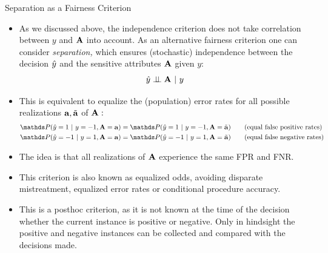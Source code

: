 \begin{vbframe}{Separation as a Fairness Criterion}
	\footnotesize{
		\begin{itemize}
			\item As we discussed above, the independence criterion does not take correlation between $y$ and $\mathbf{A}$ into account. As an alternative fairness criterion one can consider \emph{separation,} which ensures (stochastic) independence between the decision $\hat{y}$ and the sensitive attributes $\mathbf{A}$ given $y:$
			$$	\hat{y} \perp \!\!\! \perp \mathbf{A} ~|~y	$$
			\item This is equivalent to equalize the (population) error rates for all possible realizations $\mathbf{a},\tilde{\mathbf{a}}$ of $\mathbf{A}:$
			\begin{align*}
				 &\P(  \yh = 1 ~|~ y = -1, \sens = \ba ) = \P(  \yh = 1 ~|~ y=-1, \sens = \batilde ) \tag{equal false positive rates}\\
				 &\P(  \yh = -1 ~|~ y = 1, \sens = \ba ) = \P(  \yh = -1 ~|~ y=1, \sens = \batilde ) \tag{equal false negative rates}
			\end{align*}
			\item The idea is that all realizations of $\mathbf{A}$ experience the same FPR and FNR.
%				
			\item This criterion is also known as equalized odds, avoiding disparate mistreatment, equalized error rates or conditional procedure accuracy.
%			
			\item This is a posthoc criterion, as it is not known at the time of the decision whether the current instance is positive or negative. Only in hindsight the positive and negative instances can be collected and compared with the decisions made. 
		\end{itemize}
	}
\end{vbframe}



